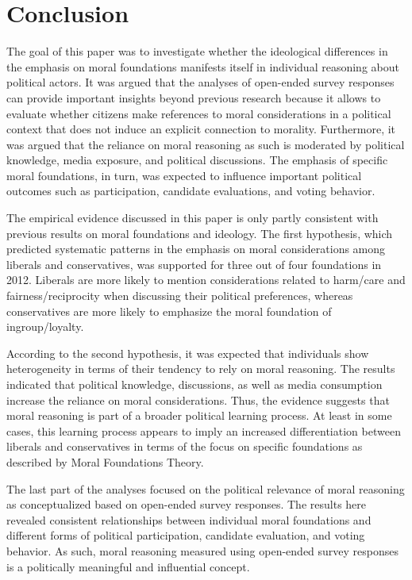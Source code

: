 \documentclass[12pt]{article}
\begin{document}
\section{Conclusion}

The goal of this paper was to investigate whether the ideological differences in the emphasis on moral foundations manifests itself in individual reasoning about political actors. It was argued that the analyses of open-ended survey responses can provide important insights beyond previous research because it allows to evaluate whether citizens make references to moral considerations in a political context that does not induce an explicit connection to morality. Furthermore, it was argued that the reliance on moral reasoning as such is moderated by political knowledge, media exposure, and political discussions. The emphasis of specific moral foundations, in turn, was expected to influence important political outcomes such as participation, candidate evaluations, and voting behavior.

The empirical evidence discussed in this paper is only partly consistent with previous results on moral foundations and ideology. The first hypothesis, which predicted systematic patterns in the emphasis on moral considerations among liberals and conservatives, was supported for three out of four foundations in 2012. Liberals are more likely to mention considerations related to harm/care and fairness/reciprocity when discussing their political preferences, whereas conservatives are more likely to emphasize the moral foundation of ingroup/loyalty.

According to the second hypothesis, it was expected that individuals show heterogeneity in terms of their tendency to rely on moral reasoning. The results indicated that political knowledge, discussions, as well as media consumption increase the reliance on moral considerations. Thus, the evidence suggests that moral reasoning is part of a broader political learning process. At least in some cases, this learning process appears to imply an increased differentiation between liberals and conservatives in terms of the focus on specific foundations as described by Moral Foundations Theory.

The last part of the analyses focused on the political relevance of moral reasoning as conceptualized based on open-ended survey responses. The results here revealed consistent relationships between individual moral foundations and different forms of political participation, candidate evaluation, and voting behavior. As such, moral reasoning measured using open-ended survey responses is a politically meaningful and influential concept.
\end{document}
